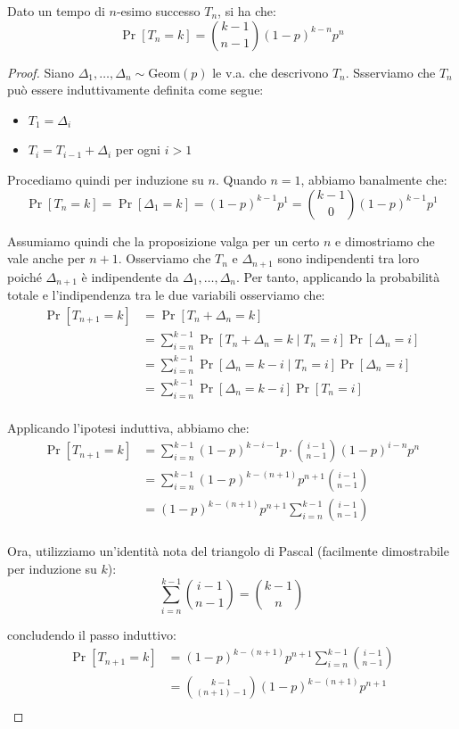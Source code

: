 \documentclass[a4paper, 12pt]{report}
\begin{document}
    \begin{framedprop}{}
        Dato un tempo di $n$-esimo successo $T_n$, si ha che:
        \[\Pr[T_n = k] = \binom{k-1}{n-1} (1-p)^{k-n} p^n\]
    \end{framedprop}

    \begin{proof}
        Siano $\Delta_1, \ldots, \Delta_n \sim \mathrm{Geom}(p)$ le v.a. che descrivono $T_n$. Ssserviamo che $T_n$ può essere induttivamente definita come segue:
        \begin{itemize}
            \item $T_1 = \Delta_i$
            \item $T_i = T_{i-1} + \Delta_i$ per ogni $i > 1$
        \end{itemize}

        Procediamo quindi per induzione su $n$. Quando $n = 1$, abbiamo banalmente che:
        \[\Pr[T_n = k] = \Pr[\Delta_1 = k] = (1-p)^{k-1} p^1 = \binom{k-1}{0} (1-p)^{k-1} p^1\]

        Assumiamo quindi che la proposizione valga per un certo $n$ e dimostriamo che vale anche per $n+1$. Osserviamo che $T_{n}$ e $\Delta_{n+1}$ sono indipendenti tra loro poiché $\Delta_{n+1}$ è indipendente da $\Delta_1, \ldots, \Delta_{n}$. Per tanto, applicando la probabilità totale e l'indipendenza tra le due variabili osserviamo che:
        \[\begin{split}
            \Pr[T_{n+1} = k] &= \Pr[T_{n} + \Delta_{n} =k]\\
            &= \sum_{i = n}^{k-1} \Pr[T_{n} + \Delta_{n} = k \mid T_n = i] \Pr[\Delta_n = i] \\
            &= \sum_{i = n}^{k-1} \Pr[\Delta_n = k-i \mid T_n = i] \Pr[\Delta_n = i] \\
            &= \sum_{i = n}^{k-1} \Pr[\Delta_n = k-i] \Pr[T_n = i] \\
        \end{split}\]

        Applicando l'ipotesi induttiva, abbiamo che:
        \[\begin{split}
            \Pr[T_{n+1} = k] &= \sum_{i = n}^{k-1} (1-p)^{k-i-1}p \cdot \binom{i-1}{n-1} (1-p)^{i-n} p^n \\
            &= \sum_{i = n}^{k-1} (1-p)^{k-(n+1)} p^{n+1} \binom{i-1}{n-1} \\
            &= (1-p)^{k-(n+1)} p^{n+1} \sum_{i = n}^{k-1} \binom{i-1}{n-1} \\
        \end{split}\]

        Ora, utilizziamo un'identità nota del triangolo di Pascal (facilmente dimostrabile per induzione su $k$):
        \[\sum_{i = n}^{k-1} \binom{i-1}{n-1} = \binom{k-1}{n}\]

        concludendo il passo induttivo:
        \[\begin{split}
            \Pr[T_{n+1} = k] &= (1-p)^{k-(n+1)} p^{n+1} \sum_{i = n}^{k-1} \binom{i-1}{n-1} \\
            &= \binom{k-1}{(n+1)-1} (1-p)^{k-(n+1)} p^{n+1} \\
        \end{split}\]
    \end{proof}
    
\end{document}
